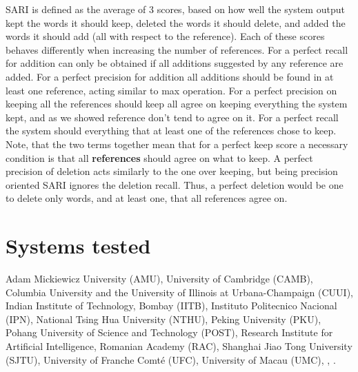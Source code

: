 \documentclass[letterpaper, 11pt]{article}
\begin{document}
SARI is defined as the average of 3 scores, based on how well the system output kept the words it should keep,
deleted the words it should delete, and added the words it should add (all with respect to the reference).
Each of these scores behaves differently when increasing the number of references.
For a perfect recall for addition can only be obtained if all additions suggested by any reference are added. For a perfect precision for addition all additions should be found in at least one reference, acting similar to max operation. For a perfect precision on keeping all the references should keep all agree on keeping everything the system kept, and as we showed reference don't tend to agree on it. For a perfect recall the system should everything that at least one of the references chose to keep. Note, that the two terms together mean that for a perfect keep score a necessary condition is that all \textbf{references} should agree on what to keep. A perfect precision of deletion acts similarly to the one over keeping, but being precision oriented SARI ignores the deletion recall. Thus, a perfect deletion would be one to delete only words, and at least one, that all references agree on.

\section{Systems tested}\label{ap:abbr}
Adam Mickiewicz University (AMU),
University of Cambridge (CAMB), Columbia University and the University of Illinois at Urbana-Champaign (CUUI),
Indian Institute of Technology, Bombay (IITB), Instituto Politecnico Nacional (IPN),
National Tsing Hua University (NTHU), Peking University (PKU), Pohang University of Science and Technology (POST),
Research Institute for Artificial Intelligence, Romanian Academy (RAC), Shanghai Jiao Tong University (SJTU),
University of Franche Comt\'{e} (UFC), University of Macau (UMC), ,  .
\end{document}
